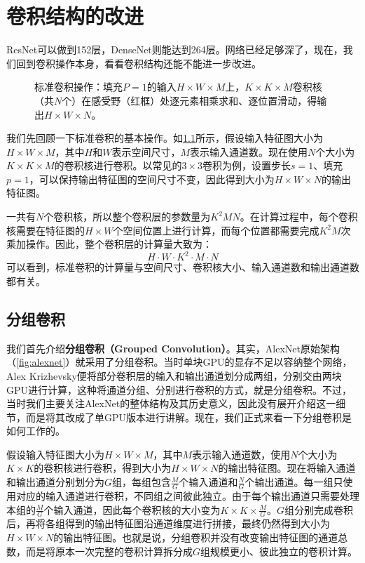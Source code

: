 
\chapter{卷积结构的改进}

ResNet可以做到152层，DenseNet则能达到264层。网络已经足够深了，现在，我们回到卷积操作本身，看看卷积结构还能不能进一步改进。

\begin{figure}[H]
    \caption{标准卷积操作：填充$P=1$的输入$H\times W\times M$上，$K\times K\times M$卷积核（共$N$个）在感受野（红框）处逐元素相乘求和、逐位置滑动，得输出$H\times W\times N$。}
    \label{fig:convolution}
\end{figure}

我们先回顾一下标准卷积的基本操作。如\cref{fig:convolution}所示，假设输入特征图大小为$H\times W\times M$，其中$H$和$W$表示空间尺寸，$M$表示输入通道数。现在使用$N$个大小为$K\times K\times M$的卷积核进行卷积。以常见的$3\times3$卷积为例，设置步长$s=1$、填充$p=1$，可以保持输出特征图的空间尺寸不变，因此得到大小为$H\times W\times N$的输出特征图。

一共有$N$个卷积核，所以整个卷积层的参数量为$K^2MN$。在计算过程中，每个卷积核需要在特征图的$H\times W$个空间位置上进行计算，而每个位置都需要完成$K^2M$次乘加操作。因此，整个卷积层的计算量大致为：
$$
H\cdot W\cdot K^2\cdot M\cdot N
$$
可以看到，标准卷积的计算量与空间尺寸、卷积核大小、输入通道数和输出通道数都有关。

\section{分组卷积}

我们首先介绍\textbf{分组卷积（Grouped Convolution）}。其实，AlexNet原始架构（\cref{fig:alexnet}）就采用了分组卷积。当时单块GPU的显存不足以容纳整个网络，Alex Krizhevsky便将部分卷积层的输入和输出通道划分成两组，分别交由两块GPU进行计算，这种将通道分组、分别进行卷积的方式，就是分组卷积。不过，当时我们主要关注AlexNet的整体结构及其历史意义，因此没有展开介绍这一细节，而是将其改成了单GPU版本进行讲解。现在，我们正式来看一下分组卷积是如何工作的。

假设输入特征图大小为$H\times W\times M$，其中$M$表示输入通道数，使用$N$个大小为$K\times K$的卷积核进行卷积，得到大小为$H\times W\times N$的输出特征图。现在将输入通道和输出通道分别划分为$G$组，每组包含$\frac{M}{G}$个输入通道和$\frac{N}{G}$个输出通道。每一组只使用对应的输入通道进行卷积，不同组之间彼此独立。由于每个输出通道只需要处理本组的$\frac{M}{G}$个输入通道，因此每个卷积核的大小变为$K\times K\times\frac{M}{G}$。$G$组分别完成卷积后，再将各组得到的输出特征图沿通道维度进行拼接，最终仍然得到大小为$H\times W\times N$的输出特征图。也就是说，分组卷积并没有改变输出特征图的通道总数，而是将原本一次完整的卷积计算拆分成$G$组规模更小、彼此独立的卷积计算。

